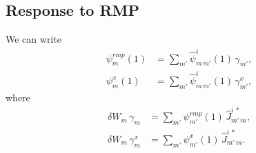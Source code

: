 \documentclass[12pt,prb,aps,notitlepage]{revtex4-1}
\begin{document}
\subsection{Response to RMP}
We can write
\begin{align}
\psi_m^{rmp}(1)&=\sum_{m'} \hat{\psi}^i_{m\,m'}(1)\,\gamma_{m'},\\[0.5ex]
\psi^x_m(1)&=\sum_{m'} \hat{\psi}^i_{m\,m'}(1)\,\gamma_{m'}^x,
\end{align}
where
\begin{align}
\delta W_m\,\gamma_{m}&= \sum_{m'} \psi_{m'}^{rmp}(1)\,\hat{J}_{m'\,m}^{i\,\ast},\\[0.5ex]
\delta W_m\,\gamma_{m}^x&= \sum_{m'} \psi_{m'}^x(1)\,\hat{J}_{m'\,m}^{i\,\ast}.
\end{align}
\end{document}
